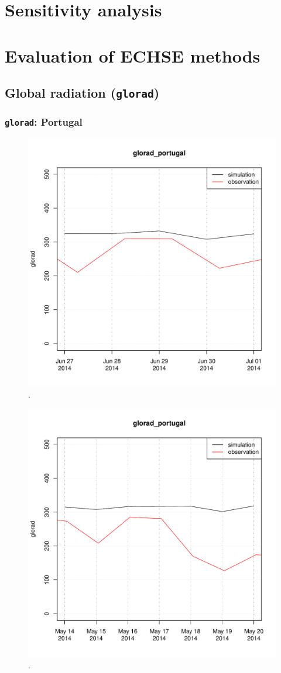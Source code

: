\documentclass{scrreprt}
\begin{document}
\chapter{Sensitivity analysis} \label{ch:sensana}


\chapter{Evaluation of ECHSE methods} \label{ch:methodcomp}

\section{Global radiation (\texttt{glorad})}

\subsection{\texttt{glorad}: Portugal}

\begin{figure}[ht]
  \centering
  \includegraphics[width=0.5\hsize]{./fig/plot_glorad_compare_portugal_HS_2014-06-26_2014-07-01.pdf}
  \caption{.}
  \label{fig:portugal_HS_glorad1}
\end{figure}

\begin{figure}[ht]
  \centering
  \includegraphics[width=0.5\hsize]{./fig/plot_glorad_compare_portugal_NSA_2014-05-13_2014-05-20.pdf}
  \caption{.}
  \label{fig:portugal_NSA_glorad1}
\end{figure}
\end{document}
